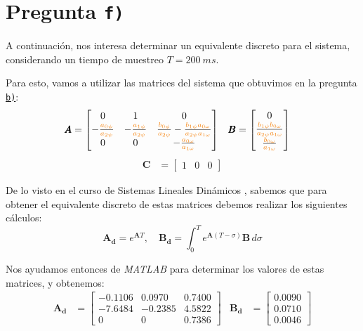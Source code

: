 \section{Pregunta \texttt{f)}}\label{pregunta-f}

A continuación, nos interesa determinar un equivalente discreto para el
sistema, considerando un tiempo de muestreo $T = 200\ \unit{ms}$.

Para esto, vamos a utilizar las matrices del sistema que obtuvimos en la pregunta
\hyperref[pregunta-b]{\texttt{b)}}:
\begin{align}
    \pmb{A} &= \begin{bmatrix}
        0 & 1 & 0 \\
        -\frac{\nara{a_{0\psi}}}{\nara{a_{2\psi}}}   & -\frac{\nara{a_{1\psi}}}{\nara{a_{2\psi}}} & \frac{\nara{b_{0\psi}}}{\nara{a_{2\psi}}} - \frac{\nara{b_{1\psi}}\nara{a_{0\omega}}}{\nara{a_{2\psi}}\nara{a_{1\omega}}} \\
        0 & 0 & -\frac{\nara{a_{0\omega}}}{\nara{a_{1\omega}}}
    \end{bmatrix} &
    \pmb{B} &= \begin{bmatrix}
        0 \\
        \frac{\nara{b_{1\psi}}\nara{b_{0\omega}}}{\nara{a_{2\psi}}\nara{a_{1\omega}}} \\
        \frac{\nara{b_{0\omega}}}{\nara{a_{1\omega}}}
    \end{bmatrix}
\end{align}
\begin{align}
  \pmb{C} &= \begin{bmatrix}
    1 & 0 & 0
  \end{bmatrix}
\end{align}

De lo visto en el curso de Sistemas Lineales Dinámicos \cite{apunte-sld}, sabemos
que para obtener el equivalente discreto de estas matrices debemos realizar los
siguientes cálculos:
\begin{equation}
\mathbf{A_d}= e^{\mathbf{A}T} ,\quad \mathbf{B_d}= \int_{0}^{T} e^{\mathbf{A}(T-\sigma)}\mathbf{B}  \,d\sigma 
\end{equation}

Nos ayudamos entonces de \textit{MATLAB} para determinar los valores de estas
matrices, y obtenemos:
\begin{align}
    \mathbf{A_d} &= \begin{bmatrix}
        -0.1106 & 0.0970 & 0.7400 \\
        -7.6484 &  -0.2385 & 4.5822 \\
        0 & 0 & 0.7386
    \end{bmatrix} &
    \mathbf{B_d} &= \begin{bmatrix}
        0.0090 \\
        0.0710 \\
        0.0046
    \end{bmatrix}
\end{align}

